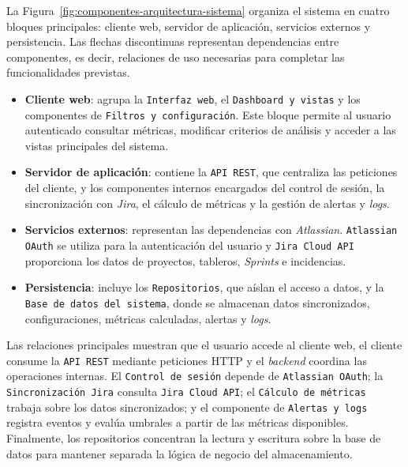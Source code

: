 La Figura~\ref{fig:componentes-arquitectura-sistema} organiza el sistema en cuatro bloques principales: cliente web, servidor de aplicación, servicios externos y persistencia. Las flechas discontinuas representan dependencias entre componentes, es decir, relaciones de uso necesarias para completar las funcionalidades previstas.

\begin{itemize}
    \item \textbf{Cliente web}: agrupa la \texttt{Interfaz web}, el \texttt{Dashboard y vistas} y los componentes de \texttt{Filtros y configuración}. Este bloque permite al usuario autenticado consultar métricas, modificar criterios de análisis y acceder a las vistas principales del sistema.
    \item \textbf{Servidor de aplicación}: contiene la \texttt{API REST}, que centraliza las peticiones del cliente, y los componentes internos encargados del control de sesión, la sincronización con \textit{Jira}, el cálculo de métricas y la gestión de alertas y \textit{logs}.
    \item \textbf{Servicios externos}: representan las dependencias con \textit{Atlassian}. \texttt{Atlassian OAuth} se utiliza para la autenticación del usuario y \texttt{Jira Cloud API} proporciona los datos de proyectos, tableros, \textit{Sprints} e incidencias.
    \item \textbf{Persistencia}: incluye los \texttt{Repositorios}, que aíslan el acceso a datos, y la \texttt{Base de datos del sistema}, donde se almacenan datos sincronizados, configuraciones, métricas calculadas, alertas y \textit{logs}.
\end{itemize}

Las relaciones principales muestran que el usuario accede al cliente web, el cliente consume la \texttt{API REST} mediante peticiones HTTP y el \textit{backend} coordina las operaciones internas. El \texttt{Control de sesión} depende de \texttt{Atlassian OAuth}; la \texttt{Sincronización Jira} consulta \texttt{Jira Cloud API}; el \texttt{Cálculo de métricas} trabaja sobre los datos sincronizados; y el componente de \texttt{Alertas y logs} registra eventos y evalúa umbrales a partir de las métricas disponibles. Finalmente, los repositorios concentran la lectura y escritura sobre la base de datos para mantener separada la lógica de negocio del almacenamiento.





\FloatBarrier

